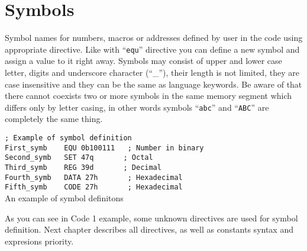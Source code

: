         \section{Symbols}
        Symbol names for numbers, macros or addresses defined by user in the code using
        appropriate directive. Like with ``\texttt{equ}'' directive you can define a new
        symbol and assign a value to it right away. Symbols may consist of upper and lower
        case letter, digits and underscore character (``\_''), their length is not limited,
        they are case insensitive and they can be the same as language keywords. Be aware of
        that there cannot coexists two or more symbols in the same memory segment which differs
        only by letter casing, in other words symbols ``\texttt{abc}'' and ``\texttt{ABC}''
        are completely the same thing.
                \begin{code}[h!]
                        {\color{highlight_comment}\verb'; Example of symbol definition'}\\
                        {\color{highlight_constant}\verb'First_symb'}\verb'    '{\color{highlight_directive}\verb'EQU'}\verb' '{\color{highlight_bin}\verb'0b100111'}\verb'   '{\color{highlight_comment}\verb'; Number in binary'}\\
                        {\color{highlight_constant}\verb'Second_symb'}\verb'   '{\color{highlight_directive}\verb'SET'}\verb' '{\color{highlight_oct}\verb'47q'}\verb'       '{\color{highlight_comment}\verb'; Octal'}\\
                        {\color{highlight_constant}\verb'Third_symb'}\verb'    '{\color{highlight_directive}\verb'REG'}\verb' '{\color{highlight_dec}\verb'39d'}\verb'       '{\color{highlight_comment}\verb'; Decimal'}\\
                        {\color{highlight_constant}\verb'Fourth_symb'}\verb'   '{\color{highlight_directive}\verb'DATA'}\verb' '{\color{highlight_hex}\verb'27h'}\verb'       '{\color{highlight_comment}\verb'; Hexadecimal'}\\
                        {\color{highlight_constant}\verb'Fifth_symb'}\verb'    '{\color{highlight_directive}\verb'CODE'}\verb' '{\color{highlight_hex}\verb'27h'}\verb'       '{\color{highlight_comment}\verb'; Hexadecimal'}\\
                        \caption{An example of symbol definitons}
                \end{code}
        As you can see in Code 1 example, some unknown directives are used for symbol definition. Next chapter describes all directives, as well
        as constants syntax and expresions priority.

